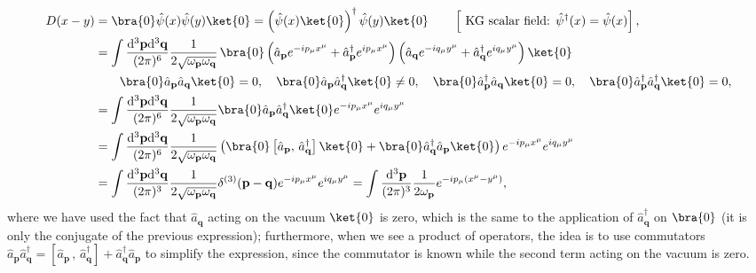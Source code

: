 \[
    \begin{aligned}
        D(x-y) & = \bra{0} \hat \psi (x) \hat \psi (y) \ket{0} = \left(\hat{\psi} (x) \ket{0}\right)^{\dagger} \hat{\psi} (y) \ket{0} \qquad \left[ \text{ KG scalar field: } \hat{\psi}^\dagger  (x)= \hat{\psi} (x) \right],                                                                                                                                                                          \\
               & = \int \frac{\mathrm{d}^3 \mathbf{p}\mathrm{d}^3 \mathbf{q}}{(2\pi)^6} \frac{1}{2\sqrt{\omega_{\mathbf{p}}\omega_{\mathbf{q}}}}\, \bra{0} \left( \hat{a}_{\mathbf{p}} e^{-i p_{\mu} x^{\mu}} + \hat{a}^{\dagger}_{\mathbf{p}} e^{i p_{\mu} x^{\mu}} \right) \left(  \hat{a}_{\mathbf{q}} e^{-i q_{\mu} y^{\mu}} + \hat{a}^{\dagger}_{\mathbf{q}} e^{i q_{\mu} y^{\mu}} \right) \ket{0} \\
               & \qquad \bra{0} \hat{a}_{\mathbf{p}} \hat{a}_{\mathbf{q}} \ket{0} = 0, \quad \bra{0} \hat{a}_{\mathbf{p}} \hat{a}^{\dagger}_{\mathbf{q}} \ket{0} \neq 0, \quad \bra{0} \hat{a}^{\dagger}_{\mathbf{p}} \hat{a}_{\mathbf{q}} \ket{0} = 0, \quad  \bra{0} \hat{a}^{\dagger}_{\mathbf{p}} \hat{a}^{\dagger}_{\mathbf{q}} \ket{0} = 0,                                                       \\
               & = \int \frac{\mathrm{d}^3 \mathbf{p}\mathrm{d}^3 \mathbf{q}}{(2\pi)^6} \frac{1}{2\sqrt{\omega_{\mathbf{p}} \omega_{\mathbf{q}}}} \bra{0} \hat{a}_{\mathbf{p}} \hat{a}^{\dagger}_{\mathbf{q}} \ket{0} e^{-i p_{\mu} x^{\mu}} e^{i q_{\mu} y^{\mu}}                                                                                                                                      \\
               & = \int \frac{\mathrm{d}^3 \mathbf{p}\mathrm{d}^3 \mathbf{q}}{(2\pi)^6} \frac{1}{2\sqrt{\omega_{\mathbf{p}} \omega_{\mathbf{q}}}} \left( \bra{0} \left[\hat{a}_{\mathbf{p}} ,\, \hat{a}^{\dagger}_{\mathbf{q}}\right] \ket{0} + \bra{0} \hat{a}^{\dagger}_{\mathbf{q}} \hat{a}_{\mathbf{p}} \ket{0} \right) e^{-i p_{\mu} x^{\mu}} e^{i q_{\mu} y^{\mu}}                                \\
               & = \int \frac{\mathrm{d}^3 \mathbf{p}\mathrm{d}^3 \mathbf{q}}{(2\pi)^3} \frac{1}{2\sqrt{\omega_{\mathbf{p}} \omega_{\mathbf{q}}}} \delta^{(3)}(\mathbf{p}-\mathbf{q}) e^{-i p_{\mu} x^{\mu}} e^{i q_{\mu} y^{\mu}} = \int \frac{\mathrm{d}^3 \mathbf{p}}{(2\pi)^3} \frac{1}{2\omega_{\mathbf{p}}} e^{-i p_{\mu} (x^{\mu}-y^{\mu})},
    \end{aligned}
\]
where we have used the fact that \(\hat a_{\mathbf{q}}\) acting on the vacuum \(\ket{0}\) is zero, which is the same to the application of \(\hat a^{\dagger}_{\mathbf{q}}\) on \(\bra{0}\) (it is only the conjugate of the previous expression); furthermore, when we see a product of operators, the idea is to use commutators \(\hat a_{\mathbf{p}} \hat a^{\dagger}_{\mathbf{q}} = \left[\hat a_{\mathbf{p}}\, ,\, \hat a^{\dagger}_{\mathbf{q}}\right] + \hat a^{\dagger}_{\mathbf{q}} \hat a_{\mathbf{p}}\) to simplify the expression, since the commutator is known while the second term acting on the vacuum is zero.

